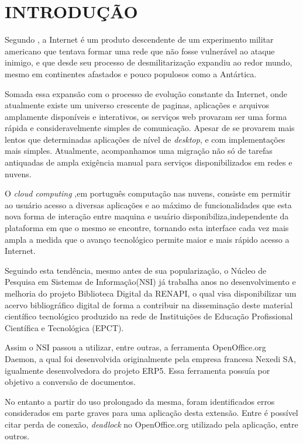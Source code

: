 \chapter{INTRODUÇÃO}
\thispagestyle{empty}

Segundo \cite{TESLA}, a Internet é um produto descendente de um experimento militar americano que tentava formar uma rede que não fosse vulnerável ao ataque inimigo, e que desde seu processo de desmilitarização expandiu ao redor mundo, mesmo em continentes afastados e pouco populosos como a Antártica.

Somada essa expansão com o processo de evolução constante da Internet, onde atualmente existe um universo crescente de paginas, aplicações e arquivos amplamente disponíveis e interativos, os serviços web provaram ser uma forma rápida e consideravelmente simples de comunicação. Apesar de se provarem mais lentos que determinadas aplicações de nível de \textit{desktop}, e com implementações mais simples. Atualmente, acompanhamos uma migração não só de tarefas antiquadas de ampla exigência manual para serviços disponibilizados em redes e nuvens.

O \textit{cloud computing} ,em português computação nas nuvens, consiste em permitir ao usuário acesso a diversas aplicações e ao máximo de funcionalidades que esta nova forma de interação entre maquina e usuário disponibiliza,independente da plataforma em que o mesmo se encontre, tornando esta interface cada vez mais ampla a medida que o avanço tecnológico permite maior e mais rápido acesso a Internet.

Seguindo esta tendência, mesmo antes de sua popularização, o Núcleo de Pesquisa em Sistemas de Informação(NSI) já trabalha anos no desenvolvimento e melhoria do projeto Biblioteca Digital da RENAPI, o qual visa disponibilizar um acervo bibliográfico digital de forma a contribuir na disseminação deste material científico tecnológico produzido na rede de Instituições de Educação Profissional Científica e Tecnológica (EPCT).

Assim o NSI passou a utilizar, entre outras, a ferramenta OpenOffice.org Daemon, a qual foi desenvolvida originalmente pela empresa francesa Nexedi SA, igualmente desenvolvedora do projeto ERP5. Essa ferramenta possuía por objetivo a conversão de documentos.

No entanto a partir do uso prolongado da mesma, foram identificados erros considerados em parte graves para uma aplicação desta extensão. Entre é possível citar perda de conexão, \textit{deadlock} no OpenOffice.org utilizado pela aplicação, entre outros.

